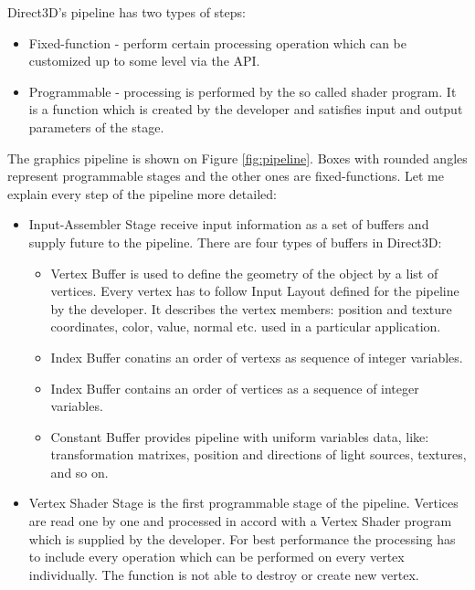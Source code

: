 \documentclass[twoside, english, 11pt]{report}
\begin{document}
Direct3D's pipeline has two types of steps:
\begin{itemize} 
\item Fixed-function - perform certain processing operation which can be customized up to some level via the API.
\item Programmable - processing is performed by the so called shader program. It is a function which is created by the developer and satisfies input and output parameters of the stage.
\end{itemize}

The graphics pipeline is shown on Figure \ref{fig:pipeline}. Boxes with rounded angles represent programmable stages and the other ones are fixed-functions. Let me explain every step of the pipeline more detailed:

\begin{itemize}
\item Input-Assembler Stage receive input information as a set of buffers and supply future to the pipeline. There are four types of buffers in Direct3D:
  \begin{itemize}
    \item Vertex Buffer is used to define the geometry of the object by a list of vertices. Every vertex has to follow Input Layout defined for the pipeline by the developer. It describes the vertex members: position and texture coordinates, color, value, normal etc. used in a particular application.
    \item Index Buffer conatins an order of vertexs as sequence of integer variables.
    \item Index Buffer contains an order of vertices as a sequence of integer variables.
    \item Constant Buffer provides pipeline with uniform variables data, like: transformation matrixes, position and directions of light sources, textures, and so on.
  \end{itemize}
\item Vertex Shader Stage is the first programmable stage of the pipeline. Vertices are read one by one and processed in accord with a Vertex Shader program which is supplied by the developer. For best performance the processing has to include every operation which can be performed on every vertex individually. The function is not able to destroy or create new vertex.


\end{itemize}
\end{document}
